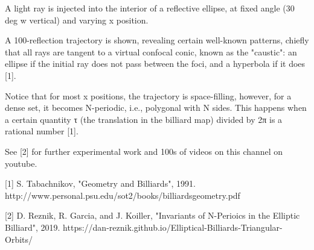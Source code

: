 A light ray is injected into the interior of a reflective ellipse, at fixed angle (30 deg w vertical) and varying x position. 

A 100-reflection trajectory is shown, revealing certain well-known patterns, chiefly that all rays are tangent to a virtual confocal conic, known as the "caustic": an ellipse if the initial ray does not pass between the foci, and a hyperbola if it does [1].

Notice that for most x positions, the trajectory is space-filling, however, for a dense set, it becomes N-periodic, i.e., polygonal with N sides. This happens when a certain quantity τ (the translation in the billiard map) divided by 2π is a rational number [1].

See [2] for further experimental work and 100s of videos on this channel on youtube.

[1] S. Tabachnikov, "Geometry and Billiards", 1991. http://www.personal.psu.edu/sot2/books/billiardsgeometry.pdf

[2] D. Reznik, R. Garcia, and J. Koiller, "Invariants of N-Perioics in the Elliptic Billiard", 2019. https://dan-reznik.github.io/Elliptical-Billiards-Triangular-Orbits/
